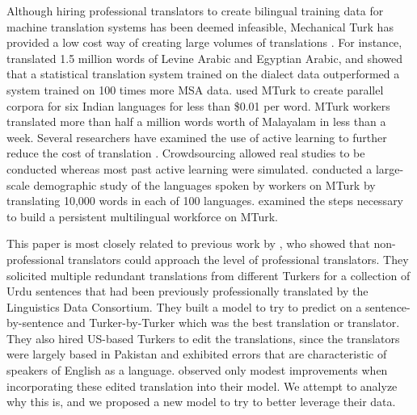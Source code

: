\documentclass[11pt]{article}
\begin{document}
Although hiring professional translators to create bilingual training data for machine translation systems has been deemed infeasible, Mechanical Turk has provided a low cost way of creating large volumes of translations \cite{Callison-Burch2009,ambati:10}.  For instance,   translated 1.5 million words of Levine Arabic and Egyptian Arabic, and showed that a statistical translation system trained on the dialect data outperformed a system trained on 100 times more MSA data.   used MTurk to create parallel corpora for six Indian languages for less than \$0.01 per word.  MTurk workers translated more than half a million words worth of Malayalam in less than a week.  Several researchers have examined the use of active learning to further reduce the cost of translation \cite{a7,AmbatiThesis,bloodgood-callisonburch:2010:ACL}.  Crowdsourcing allowed real studies to be conducted whereas most past active learning were simulated.  conducted a large-scale demographic study of the languages spoken by workers on MTurk by translating 10,000 words in each of 100 languages.    examined the steps necessary to build a persistent multilingual workforce on MTurk.

This paper is most closely related to previous work by , who showed that non-professional translators could approach the level of professional translators.  They solicited multiple redundant translations from different Turkers for a collection of Urdu sentences that had been previously professionally translated by the Linguistics Data Consortium.  They built a model to try to predict on a sentence-by-sentence and Turker-by-Turker which was the best translation or translator.  They also hired US-based Turkers to edit the translations, since the translators were largely based in Pakistan and exhibited errors that are characteristic of speakers of English as a language.  observed only modest improvements when incorporating these edited translation into their model.  We attempt to analyze why this is, and we proposed a new model to try to better leverage their data.
\end{document}
